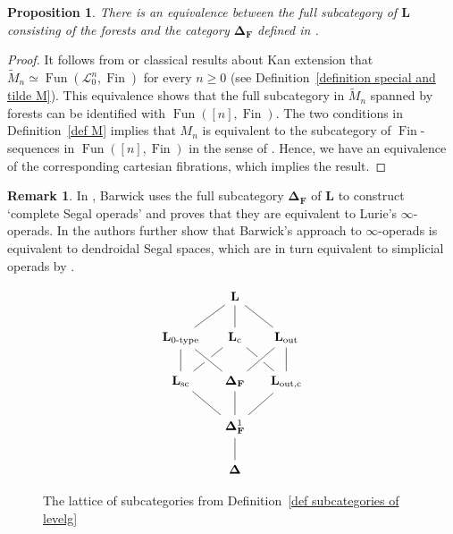 \documentclass{amsart}
\numberwithin{theorem}{subsection}
\newtheorem{proposition}[theorem]{Proposition}
\theoremstyle{definition}
\newtheorem{remark}[theorem]{Remark}
\newcommand{\xFun}{\operatorname{Fun}}
\newcommand{\finset}{\operatorname{Fin}}
\newcommand{\finsetskel}{\mathbf{F}}
\newcommand{\name}[1]{\ensuremath{\text{\textup{#1}}}}
\newcommand{\simp}{\mathbf{\Delta}}
\newcommand{\levelg}{\mathbf{L}}
\newcommand{\levelgconn}{\levelg_{\name{c}}}
\newcommand{\scriptyell}{\mathscr L}
\begin{document}
\begin{proposition}\label{prop DF}
	There is an equivalence between the full subcategory of $\levelg$ consisting of the forests and the category $\simp_{\finsetskel}$ defined in \cite{bar}.
\end{proposition}
\begin{proof}
	It follows from \cite[Proposition 4.3.2.15]{ht} or classical results about Kan extension that $\widetilde{M}_n \simeq \xFun(\scriptyell^n_0,\finset)$ for every $n\geq 0$ (see Definition~\ref{definition special and tilde M}).
	This equivalence shows that the full subcategory in $\widetilde{M}_n$ spanned by forests can be identified with $\xFun([n],\finset)$. The two conditions in Definition~\ref{def M} implies that $M_n$ is equivalent to the subcategory of $\finset$-sequences in $\xFun([n],\finset)$ in the sense of \cite[Definition 2.4]{bar}. Hence, we have an equivalence of the corresponding cartesian fibrations, which implies the result.
\end{proof}

\begin{remark}
In \cite{bar}, Barwick uses the full subcategory $\simp_{\finsetskel}$ of $\levelg$ to construct `complete Segal operads' and proves that they are equivalent to Lurie's $\infty$-operads. 
In \cite{ChuHaugsengHeuts} the authors further show that Barwick's approach to $\infty$-operads is equivalent to dendroidal Segal spaces, which are in turn equivalent to simplicial operads by \cite{CisinkiMoerdijk2}.
\end{remark}

\begin{figure}
\[ \begin{tikzcd}[column sep=small]
& \levelg \arrow[d, no head] \arrow[dr, no head] \arrow[dl, no head] \\
\levelg_{\name{0-type}} \arrow[d, no head] & \levelgconn \arrow[dl, no head] \arrow[dr, no head] & \levelg_{\name{out}} \arrow[d, no head] \arrow[dl, no head, crossing over] \\
\levelg_{\name{sc}} \arrow[dr, no head] & \simp_{\finsetskel} \arrow[d, no head] \arrow[ul, no head, crossing over] & \levelg_{\name{out,c}} \arrow[dl, no head] \\
& \simp_{\finsetskel}^1 \arrow[d, no head] \\
& \simp
\end{tikzcd} \]
\caption{The lattice of subcategories from Definition~\ref{def subcategories of levelg}} \label{figure lattice of subcategories}
\end{figure}
\end{document}
